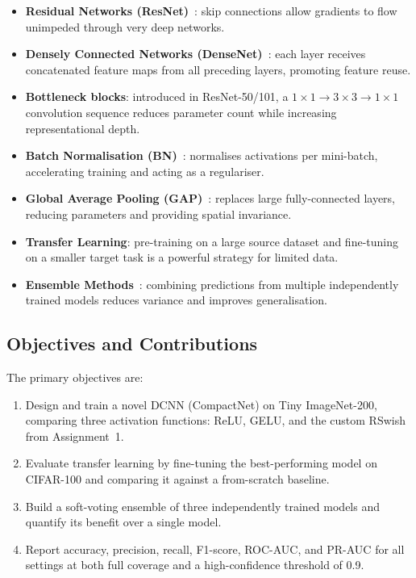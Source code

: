 \documentclass[11pt,letterpaper]{article}
\begin{document}
\begin{itemize}[noitemsep]
  \item \textbf{Residual Networks (ResNet)}~\cite{he2016deep}: skip connections allow
        gradients to flow unimpeded through very deep networks.
  \item \textbf{Densely Connected Networks (DenseNet)}~\cite{huang2017densely}: each
        layer receives concatenated feature maps from all preceding layers, promoting
        feature reuse.
  \item \textbf{Bottleneck blocks}: introduced in ResNet-50/101, a
        $1\!\times\!1\!\to\!3\!\times\!3\!\to\!1\!\times\!1$ convolution sequence
        reduces parameter count while increasing representational depth.
  \item \textbf{Batch Normalisation (BN)}~\cite{ioffe2015batch}: normalises activations
        per mini-batch, accelerating training and acting as a regulariser.
  \item \textbf{Global Average Pooling (GAP)}~\cite{lin2013network}: replaces
        large fully-connected layers, reducing parameters and providing spatial
        invariance.
  \item \textbf{Transfer Learning}: pre-training on a large source dataset and
        fine-tuning on a smaller target task is a powerful strategy for limited data.
  \item \textbf{Ensemble Methods}~\cite{opitz1999popular}: combining predictions from
        multiple independently trained models reduces variance and improves
        generalisation.
\end{itemize}

\subsection{Objectives and Contributions}

The primary objectives are:
\begin{enumerate}[noitemsep]
  \item Design and train a novel DCNN (CompactNet) on Tiny ImageNet-200, comparing
        three activation functions: ReLU, GELU, and the custom RSwish from
        Assignment~1.
  \item Evaluate transfer learning by fine-tuning the best-performing model on
        CIFAR-100 and comparing it against a from-scratch baseline.
  \item Build a soft-voting ensemble of three independently trained models and
        quantify its benefit over a single model.
  \item Report accuracy, precision, recall, F1-score, ROC-AUC, and PR-AUC for all
        settings at both full coverage and a high-confidence threshold of 0.9.
\end{enumerate}
\end{document}

